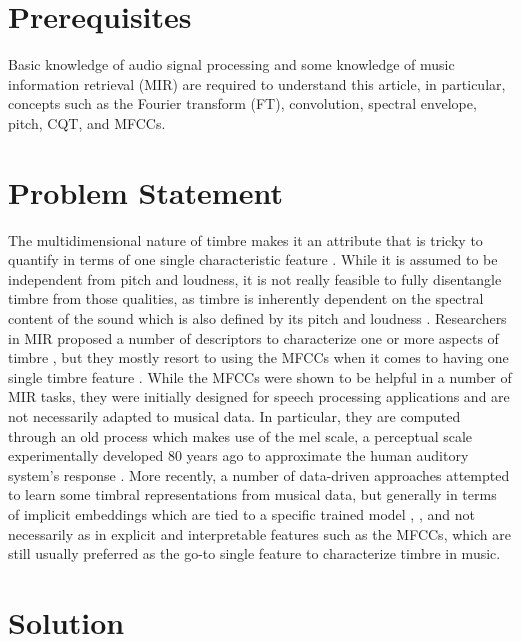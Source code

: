 \documentclass[journal]{IEEEtran}
\begin{document}
\section{Prerequisites}

Basic knowledge of audio signal processing and some knowledge of music information retrieval (MIR) \cite{mueller2007} are required to understand this article, in particular, concepts such as the Fourier transform (FT), convolution, spectral envelope, pitch, CQT, and MFCCs.


\section{Problem Statement}

The multidimensional nature of timbre makes it an attribute that is tricky to quantify in terms of one single characteristic feature \cite{grey1977}. While it is assumed to be independent from pitch and loudness, it is not really feasible to fully disentangle timbre from those qualities, as timbre is inherently dependent on the spectral content of the sound which is also defined by its pitch and loudness \cite{moore2004}. Researchers in MIR proposed a number of descriptors to characterize one or more aspects of timbre \cite{peeters2011}, but they mostly resort to using the MFCCs when it comes to having one single timbre feature \cite{mueller2007}. While the MFCCs were shown to be helpful in a number of MIR tasks, they were initially designed for speech processing applications \cite{mermelstein1976} and are not necessarily adapted to musical data. In particular, they are computed through an old process which makes use of the mel scale, a perceptual scale experimentally developed 80 years ago to approximate the human auditory system's response \cite{stevens1937}. More recently, a number of data-driven approaches attempted to learn some timbral representations from musical data, but generally in terms of implicit embeddings which are tied to a specific trained model \cite{engel2017}, \cite{pons2017}, and not necessarily as in explicit and interpretable features such as the MFCCs, which are still usually preferred as the go-to single feature to characterize timbre in music.


\section{Solution}

%
%
\end{document}
